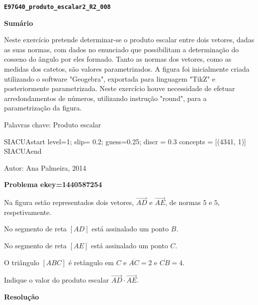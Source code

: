 \documentclass{article}
\begin{document}
{\centering\bf \verb"E97G40_produto_escalar2_R2_008" }

\noindent\textbf{Sumário}


Neste exercício pretende determinar-se o produto escalar entre dois vetores, dadas as suas normas, com dados no enunciado que possibilitam a determinação do cosseno do ângulo por eles formado. Tanto as normas dos vetores, como as medidas dos catetos, são valores parametrizados. 
A figura foi inicialmente criada utilizando o software "Geogebra", exportada para linguagem "TikZ" e posteriormente parametrizada.
Neste exercício houve necessidade de efetuar arredondamentos de números, utilizando instrução "round", para a parametrização da figura.



Palavras chave: Produto escalar


SIACUAstart
level=1;  slip= 0.2; guess=0.25; discr = 0.3 
concepts = [(4341, 1)]
SIACUAend

Autor: Ana Palmeira, 2014




\noindent\textbf{Problema ekey=1440587254 }



Na figura estão representados dois vetores, $\overrightarrow{AD}$ e $\overrightarrow{AE}$, de normas $5$ e $5$, respetivamente.


No segmento de reta $[AD]$ está assinalado um ponto $B$.

No segmento de reta $[AE]$ está assinalado um ponto $C$.

O triângulo $[ABC]$ é retângulo em $C$ e $\overline{AC}=2$ e $\overline{CB}=4$.


Indique o valor do produto escalar $\overrightarrow{AD} \cdot \overrightarrow{AE}$.

    

 

\noindent\textbf{Resolução}
\end{document}
